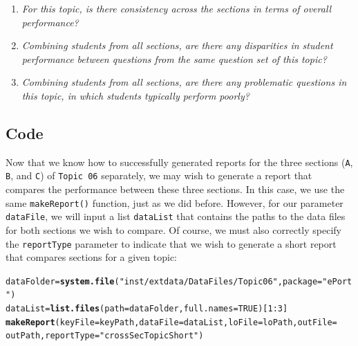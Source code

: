 \documentclass[11pt,a4paper,oldfontcommands,openany]{memoir}
\makeatletter
\newcommand{\hlnum}[1]{\textcolor[rgb]{0.686,0.059,0.569}{#1}}%
\newcommand{\hlstr}[1]{\textcolor[rgb]{0.192,0.494,0.8}{#1}}%
\newcommand{\hlopt}[1]{\textcolor[rgb]{0,0,0}{#1}}%
\newcommand{\hlstd}[1]{\textcolor[rgb]{0.345,0.345,0.345}{#1}}%
\newcommand{\hlkwb}[1]{\textcolor[rgb]{0.69,0.353,0.396}{#1}}%
\newcommand{\hlkwc}[1]{\textcolor[rgb]{0.333,0.667,0.333}{#1}}%
\newcommand{\hlkwd}[1]{\textcolor[rgb]{0.737,0.353,0.396}{\textbf{#1}}}%
\newenvironment{kframe}{%
 \def\at@end@of@kframe{}%
 \ifinner\ifhmode%
  \def\at@end@of@kframe{\end{minipage}}%
  \begin{minipage}{\columnwidth}%
 \fi\fi%
 \def\FrameCommand##1{\hskip\@totalleftmargin \hskip-\fboxsep
 \colorbox{shadecolor}{##1}\hskip-\fboxsep
     \hskip-\linewidth \hskip-\@totalleftmargin \hskip\columnwidth}%
 \MakeFramed {\advance\hsize-\width
   \@totalleftmargin\z@ \linewidth\hsize
   \@setminipage}}%
 {\par\unskip\endMakeFramed%
 \at@end@of@kframe}
\newenvironment{knitrout}{}{} %
\numberwithin{equation}{section} %
\makeatother
\begin{document}
\begin{enumerate}
\item \textit{For this topic, is there consistency across the sections in terms of overall performance?}
\item \textit{Combining students from all sections, are there any disparities in student performance between questions from the same question set of this topic?}
\item \textit{Combining students from all sections, are there any problematic questions in this topic, in which students typically perform poorly?}
\end{enumerate}

\subsection{Code}

Now that we know how to successfully generated reports for the three sections (\texttt{A}, \texttt{B}, and \texttt{C}) of \texttt{Topic 06} separately, we may wish to generate a report that compares the performance between these three sections. In this case, we use the same \texttt{makeReport()} function, just as we did before. However, for our parameter \texttt{dataFile}, we will input a list \texttt{dataList} that contains the paths to the data files for both sections we wish to compare. Of course, we must also correctly specify the \texttt{reportType} parameter to indicate that we wish to generate a short report that compares sections for a given topic: \\

\begin{knitrout}
\color{fgcolor}\begin{kframe}
\begin{alltt}
\hlstd{dataFolder} \hlkwb{=} \hlkwd{system.file}\hlstd{(}\hlstr{"inst/extdata/DataFiles/Topic06"}\hlstd{,} \hlkwc{package} \hlstd{=} \hlstr{"ePort"}\hlstd{)}
\hlstd{dataList} \hlkwb{=} \hlkwd{list.files}\hlstd{(}\hlkwc{path} \hlstd{= dataFolder,} \hlkwc{full.names} \hlstd{=} \hlnum{TRUE}\hlstd{)[}\hlnum{1}\hlopt{:}\hlnum{3}\hlstd{]}
\hlkwd{makeReport}\hlstd{(}\hlkwc{keyFile} \hlstd{= keyPath,} \hlkwc{dataFile} \hlstd{= dataList,} \hlkwc{loFile} \hlstd{= loPath,} \hlkwc{outFile} \hlstd{=}
  \hlstd{outPath,} \hlkwc{reportType} \hlstd{=} \hlstr{"crossSecTopicShort"}\hlstd{)}
\end{alltt}
\end{kframe}
\end{knitrout}
\end{document}
